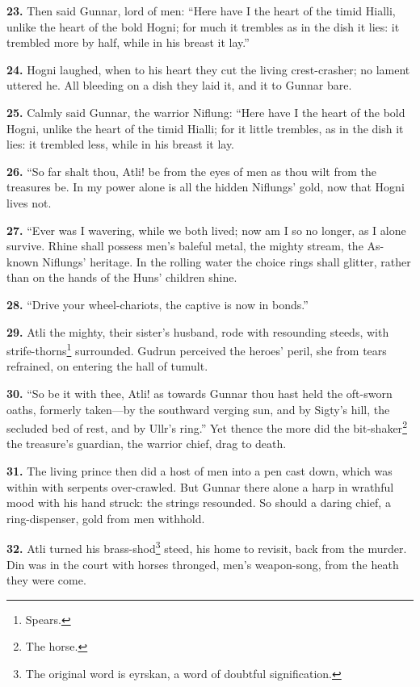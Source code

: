 \textbf{23.} Then said Gunnar, lord of men: ``Here have I the heart of the
timid Hialli, unlike the heart of the bold Hogni; for much it trembles
as in the dish it lies: it trembled more by half, while in his breast
it lay.''

\textbf{24.} Hogni laughed, when to his heart they cut the living
crest-crasher; no lament uttered he. All bleeding on a dish they laid
it, and it to Gunnar bare.

\textbf{25.} Calmly said Gunnar, the warrior Niflung: ``Here have I the heart
of the bold Hogni, unlike the heart of the timid Hialli; for it little
trembles, as in the dish it lies: it trembled less, while in his
breast it lay.

\textbf{26.} ``So far shalt thou, Atli! be from the eyes of men as thou wilt
from the treasures be. In my power alone is all the hidden Niflungs'
gold, now that Hogni lives not.

\textbf{27.} ``Ever was I wavering, while we both lived; now am I so no
longer, as I alone survive. Rhine shall possess men's baleful metal,
the mighty stream, the As-known Niflungs' heritage. In the rolling
water the choice rings shall glitter, rather than on the hands of the
Huns' children shine.

\textbf{28.} ``Drive your wheel-chariots, the captive is now in bonds.''

\textbf{29.} Atli the mighty, their sister's husband, rode with resounding
steeds, with strife-thorns\footnote{Spears.} surrounded. Gudrun perceived the
heroes' peril, she from tears refrained, on entering the hall of
tumult.

\textbf{30.} ``So be it with thee, Atli! as towards Gunnar thou hast held the
oft-sworn oaths, formerly taken—by the southward verging sun, and by
Sigty's hill, the secluded bed of rest, and by Ullr's ring.'' Yet
thence the more did the bit-shaker\footnote{The horse.} the treasure's guardian, the
warrior chief, drag to death.

\textbf{31.} The living prince then did a host of men into a pen cast down,
which was within with serpents over-crawled. But Gunnar there alone a
harp in wrathful mood with his hand struck: the strings resounded. So
should a daring chief, a ring-dispenser, gold from men withhold.

\textbf{32.} Atli turned his brass-shod\footnote{The original word is eyrskan, a word of doubtful
signification.} steed, his home to revisit, back
from the murder. Din was in the court with horses thronged, men's
weapon-song, from the heath they were come.

